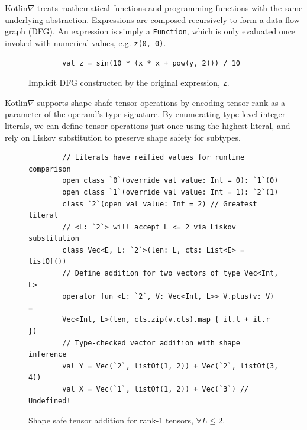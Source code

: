 \documentclass[12pt,initial,twoside,maitrise]{dms}
\numberwithin{equation}{section}
\numberwithin{table}{chapter}
\numberwithin{figure}{chapter}
\begin{document}
Kotlin$\nabla$ treats mathematical functions and programming functions with the same underlying abstraction. Expressions are composed recursively to form a data-flow graph (DFG). An expression is simply a \texttt{Function}, which is only evaluated once invoked with numerical values, e.g. \texttt{z(0, 0)}.

\begin{figure}[!htb]
    \begin{verbatim}
        val z = sin(10 * (x * x + pow(y, 2))) / 10
    \end{verbatim}
    \centering
    \caption{Implicit DFG constructed by the original expression, \texttt{z}.}
\end{figure}

Kotlin$\nabla$ supports shape-shafe tensor operations by encoding tensor rank as a parameter of the operand's type signature. By enumerating type-level integer literals, we can define tensor operations just once using the highest literal, and rely on Liskov substitution to preserve shape safety for subtypes.

\begin{figure}[!htb]
    \begin{verbatim}
        // Literals have reified values for runtime comparison
        open class `0`(override val value: Int = 0): `1`(0)
        open class `1`(override val value: Int = 1): `2`(1)
        class `2`(open val value: Int = 2) // Greatest literal
        // <L: `2`> will accept L <= 2 via Liskov substitution
        class Vec<E, L: `2`>(len: L, cts: List<E> = listOf())
        // Define addition for two vectors of type Vec<Int, L>
        operator fun <L: `2`, V: Vec<Int, L>> V.plus(v: V) =
        Vec<Int, L>(len, cts.zip(v.cts).map { it.l + it.r })
        // Type-checked vector addition with shape inference
        val Y = Vec(`2`, listOf(1, 2)) + Vec(`2`, listOf(3, 4))
        val X = Vec(`1`, listOf(1, 2)) + Vec(`3`) // Undefined!
    \end{verbatim}
    \caption{Shape safe tensor addition for rank-1 tensors, $\forall L\leq2.$}
\end{figure}
\end{document}
